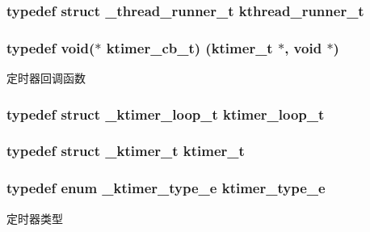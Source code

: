 \subsubsection[{kthread\+\_\+runner\+\_\+t}]{\setlength{\rightskip}{0pt plus 5cm}typedef struct {\bf \+\_\+thread\+\_\+runner\+\_\+t} {\bf kthread\+\_\+runner\+\_\+t}}\label{a00051_a4f78c259c9527c821f1a6f87495dd339_a4f78c259c9527c821f1a6f87495dd339}
\hypertarget{a00051_a2333fd0f2c3a85faf586300ca40deed4_a2333fd0f2c3a85faf586300ca40deed4}{}
\subsubsection[{ktimer\+\_\+cb\+\_\+t}]{\setlength{\rightskip}{0pt plus 5cm}typedef void($\ast$ ktimer\+\_\+cb\+\_\+t) ({\bf ktimer\+\_\+t} $\ast$, void $\ast$)}\label{a00051_a2333fd0f2c3a85faf586300ca40deed4_a2333fd0f2c3a85faf586300ca40deed4}
定时器回调函数 \hypertarget{a00051_a024af2aa29615e7a811ea6c45438157d_a024af2aa29615e7a811ea6c45438157d}{}
\subsubsection[{ktimer\+\_\+loop\+\_\+t}]{\setlength{\rightskip}{0pt plus 5cm}typedef struct {\bf \+\_\+ktimer\+\_\+loop\+\_\+t} {\bf ktimer\+\_\+loop\+\_\+t}}\label{a00051_a024af2aa29615e7a811ea6c45438157d_a024af2aa29615e7a811ea6c45438157d}
\hypertarget{a00051_a846172ea4e8a86449eca41a3d8e074b7_a846172ea4e8a86449eca41a3d8e074b7}{}
\subsubsection[{ktimer\+\_\+t}]{\setlength{\rightskip}{0pt plus 5cm}typedef struct {\bf \+\_\+ktimer\+\_\+t} {\bf ktimer\+\_\+t}}\label{a00051_a846172ea4e8a86449eca41a3d8e074b7_a846172ea4e8a86449eca41a3d8e074b7}
\hypertarget{a00051_a42e924130e6eb3bd995344f6d3f3e918_a42e924130e6eb3bd995344f6d3f3e918}{}
\subsubsection[{ktimer\+\_\+type\+\_\+e}]{\setlength{\rightskip}{0pt plus 5cm}typedef enum {\bf \+\_\+ktimer\+\_\+type\+\_\+e}  {\bf ktimer\+\_\+type\+\_\+e}}\label{a00051_a42e924130e6eb3bd995344f6d3f3e918_a42e924130e6eb3bd995344f6d3f3e918}
定时器类型 

